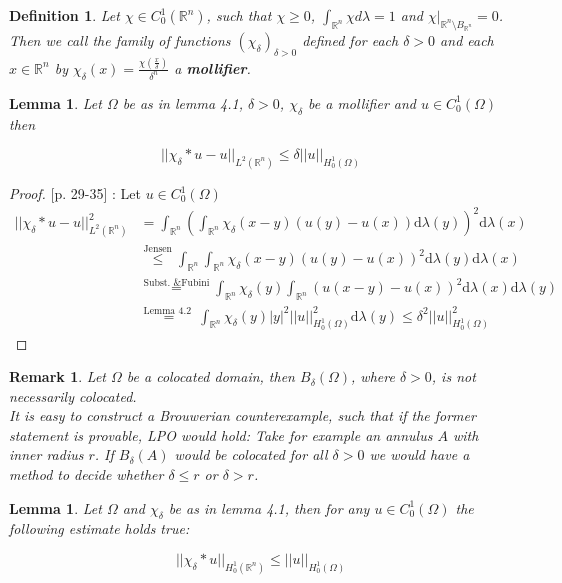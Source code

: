 \documentclass[11pt,a4paper,leqno]{report}
\newtheorem{lemma}[theorem]{Lemma}
\newtheorem{definition}[theorem]{Definition}
\newtheorem{remark}[theorem]{Remark}
\numberwithin{equation}{chapter}
\begin{document}
\begin{definition} Let $\chi\in C^1_0(\mathbb{R}^n)$, such that $\chi\geq 0$, $\int_{\mathbb{R}^n}\chi d\lambda=1$ and $\chi|_{\mathbb{R}^n\setminus B_{\mathbb{R}^n}}=0$. Then  we call the family of functions $(\chi_\delta)_{\delta>0}$ defined for each $\delta>0$ and each $x\in\mathbb{R}^n$ by 
$\chi_\delta(x)=\frac{\chi(\frac{x}{\delta})}{\delta^n}$
a \textbf{mollifier}. \end{definition}
\begin{lemma} Let $\Omega$ be as in lemma 4.1, $\delta>0$, $\chi_\delta$ be a mollifier and $u\in C^1_0(\Omega)$ then \begin{small}\begin{equation}||\chi_\delta*u-u||_{L^2(\mathbb{R}^n)}\leq\delta||u||_{H^1_0(\Omega)}\end{equation}\end{small}\end{lemma}
\begin{proof}\cite{Haslinger} [p. 29-35] : Let $u\in C^1_0(\Omega)$
\begin{align*}||\chi_\delta*u-u||_{L^2(\mathbb{R}^n)}^2&=\int_{\mathbb{R}^n}(\int_{\mathbb{R}^n}\chi_\delta(x-y)(u(y)-u(x))\mathrm{d}\lambda(y))^2\mathrm{d}\lambda(x)\\
&\overset{\text{Jensen}}{\leq} \int_{\mathbb{R}^n}\int_{\mathbb{R}^n}\chi_\delta(x-y)(u(y)-u(x))^2\mathrm{d}\lambda(y)\mathrm{d}\lambda(x)\\
&\overset{\text{Subst. \& Fubini}}{=} \int_{\mathbb{R}^n}\chi_\delta(y)\int_{\mathbb{R}^n}(u(x-y)-u(x))^2\mathrm{d}\lambda(x)\mathrm{d}\lambda(y)\\
&\overset{\text{Lemma 4.2 }}{=} \int_{\mathbb{R}^n}\chi_\delta(y)|y|^2||u||_{H^1_0(\Omega)}^2\mathrm{d}\lambda(y)\leq \delta^2||u||_{H^1_0(\Omega)}^2\end{align*}
\end{proof} 
\begin{remark} Let $\Omega$ be a colocated domain, then $B_\delta(\Omega)$, where $\delta>0$, is not necessarily colocated. \\It is easy to construct a Brouwerian counterexample, such that if the former statement is provable, LPO would hold: Take for example an annulus $A$ with inner radius $r$. If $B_\delta(A)$ would be colocated for all $\delta>0$ we would have a method to decide whether $\delta\leq r$ or $\delta> r$.\end{remark}
\begin{lemma} Let $\Omega$ and $\chi_\delta$ be as in lemma 4.1, then for any $u\in C^1_0(\Omega)$ the following estimate holds true:
\begin{small}\begin{equation}||\chi_\delta*u||_{H^1_0(\mathbb{R}^n)}\leq||u||_{H^1_0(\Omega)}\end{equation}\end{small}\end{lemma}
\end{document}
